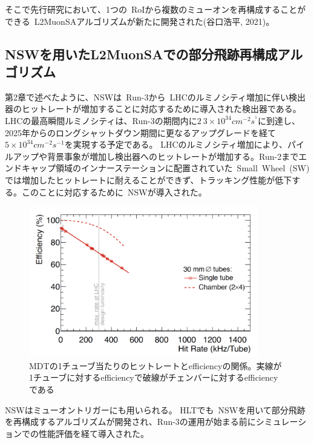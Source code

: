 そこで先行研究\cite{article:taniguchi}において、1つの~RoIから複数のミューオンを再構成することができる~L2MuonSAアルゴリズムが新たに開発された(谷口浩平, 2021)。


\subsection{NSWを用いたL2MuonSAでの部分飛跡再構成アルゴリズム}\label{chapter3-3-2}
第2章で述べたように、NSWは~Run-3から~LHCのルミノシティ増加に伴い検出器のヒットレートが増加することに対応するために導入された検出器である。
LHCの最高瞬間ルミノシティは、Run-3の期間内に$2~3\times10^{34}cm^{-2}s^{^1}$に到達し、2025年からのロングシャットダウン期間に更なるアップグレードを経て$5\times10^{34}cm^{-2}s^{-1}$を実現する予定である。
LHCのルミノシティ増加により、パイルアップや背景事象が増加し検出器へのヒットレートが増加する。Run-2までエンドキャップ領域のインナーステーションに配置されていた~Small~Wheel~(SW)では増加したヒットレートに耐えることができず、トラッキング性能が低下する。このことに対応するために~NSWが導入された。

\begin{figure}[H]
    \centering
    \includegraphics[clip, width=10cm]{fig/3/NSW_HitRate.png}
    \caption{MDTの1チューブ当たりのヒットレートとefficiencyの関係。実線が1チューブに対するefficiencyで破線がチェンバーに対するefficiencyである\cite{article:ATLASNSWTDR}}
    \label{fig:3-14}
\end{figure}


NSWはミューオントリガーにも用いられる。
HLTでも~NSWを用いて部分飛跡を再構成するアルゴリズムが開発され、Run-3の運用が始まる前にシミュレーションでの性能評価を経て導入された。

